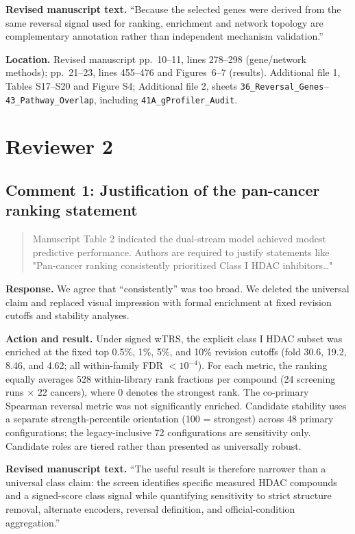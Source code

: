 \documentclass[10pt]{article}
\newenvironment{reviewcomment}{%
  \begin{quote}\small\itshape\color{black}
}{\end{quote}}
\newcommand{\Response}{\textbf{Response.} }
\newcommand{\Action}{\textbf{Action and result.} }
\newcommand{\RevisedText}{\textbf{Revised manuscript text.} }
\newcommand{\Location}{\textbf{Location.} }
\newcommand{\qtext}[1]{``#1''}
\begin{document}
\RevisedText \qtext{Because the selected genes were derived from the same reversal signal used for ranking, enrichment and network topology are complementary annotation rather than independent mechanism validation.}

\Location Revised manuscript pp.~10--11, lines 278--298 (gene/network methods); pp.~21--23, lines 455--476 and Figures~6--7 (results). Additional file 1, Tables S17--S20 and Figure S4; Additional file 2, sheets \texttt{36\_Reversal\_Genes}--\texttt{43\_Pathway\_Overlap}, including \texttt{41A\_gProfiler\_Audit}.

\clearpage
\section*{Reviewer 2}

\subsection*{Comment 1: Justification of the pan-cancer ranking statement}
\begin{reviewcomment}
Manuscript Table 2 indicated the dual-stream model achieved modest predictive performance. Authors are required to justify statements like "Pan-cancer ranking consistently prioritized Class I HDAC inhibitors…"
\end{reviewcomment}

\Response We agree that \qtext{consistently} was too broad. We deleted the universal claim and replaced visual impression with formal enrichment at fixed revision cutoffs and stability analyses.

\Action Under signed wTRS, the explicit class I HDAC subset was enriched at the fixed top 0.5\%, 1\%, 5\%, and 10\% revision cutoffs (fold 30.6, 19.2, 8.46, and 4.62; all within-family FDR $<10^{-4}$). For each metric, the ranking equally averages 528 within-library rank fractions per compound (24 screening runs $\times$ 22 cancers), where 0 denotes the strongest rank. The co-primary Spearman reversal metric was not significantly enriched. Candidate stability uses a separate strength-percentile orientation (100 = strongest) across 48 primary configurations; the legacy-inclusive 72 configurations are sensitivity only. Candidate roles are tiered rather than presented as universally robust.

\RevisedText \qtext{The useful result is therefore narrower than a universal class claim: the screen identifies specific measured HDAC compounds and a signed-score class signal while quantifying sensitivity to strict structure removal, alternate encoders, reversal definition, and official-condition aggregation.}
\end{document}
